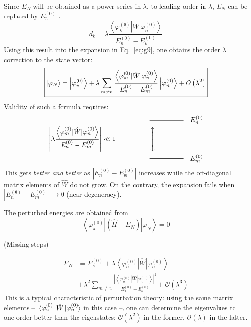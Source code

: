\documentclass[12pt]{article}
\newcommand{\be}{\begin{equation}}
\newcommand{\ee}{\end{equation}}
\begin{document}
Since $E_{N}$ will be obtained as a power series in $\lambda$,
to leading order in $\lambda$, $E_{N}$ can be replaced by $E_{n}^{(0)}$ :
\be
d_{k}=\lambda \frac{\left\langle\varphi_{k}^{(0)}|\hat{W}| \varphi_{n}^{(0)}\right\rangle}{E_{n}^{(0)}-E_{k}^{(0)}}
\ee
Using this result into the expansion in Eq.~\eqref{eq:g9}, one
obtains the order $\lambda$ correction to the state vector:
\be
\boxed{%
\left|\varphi_{N}\right\rangle=\left|\varphi_{n}^{(0)}\right\rangle+\lambda \sum_{m \neq n} \frac{\left\langle\varphi_{m}^{(0)}|\hat{W}| \varphi_{n}^{(0)}\right\rangle}{E_{n}^{(0)}-E_{m}^{(0)}}\left|\varphi_{n}^{(0)}\right\rangle+O\left(\lambda^{2}\right)
}
\label{eq:g18}
\ee
Validity of such a formula requires:
\be
\left|\lambda \frac{\left\langle\varphi_{m}^{(0)}|\hat{W}| \varphi_{n}^{(0)}\right\rangle}{E_{n}^{(0)}-E_{m}^{(0)}}\right| \ll 1\hspace{5em}%
\begin{aligned}
&\text{\rule[0.5ex]{5em}{1pt}}\quad E_n^{(0)}\\
&\rotatebox[origin=c]{90}{\ensuremath{\xleftrightarrow{\hspace{3em}}}}\\
&\text{\rule[0.5ex]{5em}{1pt}}\quad E_m^{(0)}
\end{aligned}
\ee
This gets \emph{better and better} as $|E_{n}^{(0)}-E_{m}^{(0)}|$ increases
while the off-diagonal matrix elements of $\hat{W}$
do not grow. On the contrary, the expansion fails
when $|E_{n}^{(0)}-E_{m}^{(0)}|$ $\rightarrow 0$ (near degeneracy).

The perturbed energies are obtained from
\[
\left\langle\varphi_{n}^{(0)}\left|\left(\hat{H}-E_{N}\right)\right| \varphi_{N}\right\rangle=0
\]

(Missing steps)
\setcounter{equation}{21}

\be
\boxed{
\begin{aligned} 
E_{N} &=E_{n}^{(0)}+\lambda\left\langle\varphi_{n}^{(0)}|\hat{W}| \varphi_{n}^{(0)}\right\rangle \\ 
&+\lambda^{2} \sum_{m \neq n} \frac{\left|\left\langle\varphi_{m}^{(0)}|\hat{W}| \varphi_{n}^{(0)}\right\rangle\right|^{2}}{E_{n}^{(0)}-E_{n}^{(0)}}+
\mathcal{O}\left(\lambda^{3}\right) 
\end{aligned}
\label{eq:g22}
}
\ee
This is a typical characteristic of perturbation theory: using the same matrix elements
-- $\bra*{\varphi_{n}^{(0)}}\hat{W}\ket*{\varphi_{n}^{(0)}}$ in this case --,
one can determine the eigenvalues to one order better than the eigenstates:
$\mathcal{O}(\lambda^2)$ in the former, $\mathcal{O}(\lambda)$ in the latter.
\end{document}
